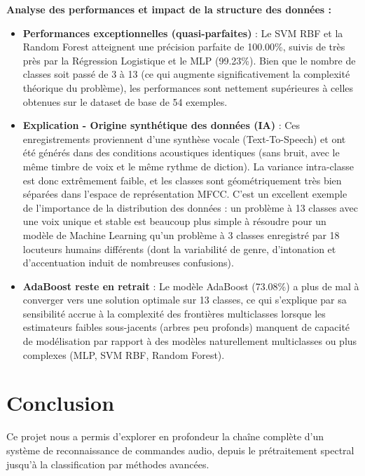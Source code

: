 \documentclass{name}
\begin{document}
\textbf{Analyse des performances et impact de la structure des données :}
\begin{itemize}
    \item \textbf{Performances exceptionnelles (quasi-parfaites)} : Le SVM RBF et la Random Forest atteignent une précision parfaite de 100.00\%, suivis de très près par la Régression Logistique et le MLP (99.23\%). Bien que le nombre de classes soit passé de 3 à 13 (ce qui augmente significativement la complexité théorique du problème), les performances sont nettement supérieures à celles obtenues sur le dataset de base de 54 exemples.
    \item \textbf{Explication - Origine synthétique des données (IA)} : Ces enregistrements proviennent d'une synthèse vocale (Text-To-Speech) et ont été générés dans des conditions acoustiques identiques (sans bruit, avec le même timbre de voix et le même rythme de diction). La variance intra-classe est donc extrêmement faible, et les classes sont géométriquement très bien séparées dans l'espace de représentation MFCC. C'est un excellent exemple de l'importance de la distribution des données : un problème à 13 classes avec une voix unique et stable est beaucoup plus simple à résoudre pour un modèle de Machine Learning qu'un problème à 3 classes enregistré par 18 locuteurs humains différents (dont la variabilité de genre, d'intonation et d'accentuation induit de nombreuses confusions).
    \item \textbf{AdaBoost reste en retrait} : Le modèle AdaBoost (73.08\%) a plus de mal à converger vers une solution optimale sur 13 classes, ce qui s'explique par sa sensibilité accrue à la complexité des frontières multiclasses lorsque les estimateurs faibles sous-jacents (arbres peu profonds) manquent de capacité de modélisation par rapport à des modèles naturellement multiclasses ou plus complexes (MLP, SVM RBF, Random Forest).
\end{itemize}

\newpage
\section{Conclusion}

Ce projet nous a permis d'explorer en profondeur la chaîne complète d'un système de reconnaissance de commandes audio, depuis le prétraitement spectral jusqu'à la classification par méthodes avancées.
\end{document}

